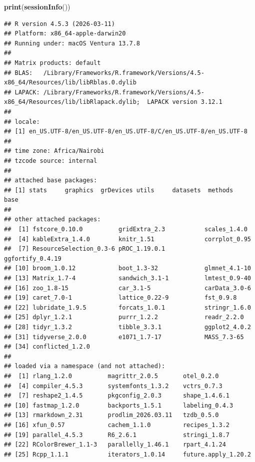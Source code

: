 \documentclass[
]{article}
\newenvironment{Shaded}{\begin{snugshade}}{\end{snugshade}}
\newcommand{\FunctionTok}[1]{\textcolor[rgb]{0.13,0.29,0.53}{\textbf{#1}}}
\newcommand{\NormalTok}[1]{#1}
\begin{document}
\begin{Shaded}
\begin{Highlighting}[]
\FunctionTok{print}\NormalTok{(}\FunctionTok{sessionInfo}\NormalTok{())}
\end{Highlighting}
\end{Shaded}

\begin{verbatim}
## R version 4.5.3 (2026-03-11)
## Platform: x86_64-apple-darwin20
## Running under: macOS Ventura 13.7.8
## 
## Matrix products: default
## BLAS:   /Library/Frameworks/R.framework/Versions/4.5-x86_64/Resources/lib/libRblas.0.dylib 
## LAPACK: /Library/Frameworks/R.framework/Versions/4.5-x86_64/Resources/lib/libRlapack.dylib;  LAPACK version 3.12.1
## 
## locale:
## [1] en_US.UTF-8/en_US.UTF-8/en_US.UTF-8/C/en_US.UTF-8/en_US.UTF-8
## 
## time zone: Africa/Nairobi
## tzcode source: internal
## 
## attached base packages:
## [1] stats     graphics  grDevices utils     datasets  methods   base     
## 
## other attached packages:
##  [1] fstcore_0.10.0          gridExtra_2.3           scales_1.4.0           
##  [4] kableExtra_1.4.0        knitr_1.51              corrplot_0.95          
##  [7] ResourceSelection_0.3-6 pROC_1.19.0.1           ggfortify_0.4.19       
## [10] broom_1.0.12            boot_1.3-32             glmnet_4.1-10          
## [13] Matrix_1.7-4            sandwich_3.1-1          lmtest_0.9-40          
## [16] zoo_1.8-15              car_3.1-5               carData_3.0-6          
## [19] caret_7.0-1             lattice_0.22-9          fst_0.9.8              
## [22] lubridate_1.9.5         forcats_1.0.1           stringr_1.6.0          
## [25] dplyr_1.2.1             purrr_1.2.2             readr_2.2.0            
## [28] tidyr_1.3.2             tibble_3.3.1            ggplot2_4.0.2          
## [31] tidyverse_2.0.0         e1071_1.7-17            MASS_7.3-65            
## [34] conflicted_1.2.0       
## 
## loaded via a namespace (and not attached):
##  [1] rlang_1.2.0          magrittr_2.0.5       otel_0.2.0          
##  [4] compiler_4.5.3       systemfonts_1.3.2    vctrs_0.7.3         
##  [7] reshape2_1.4.5       pkgconfig_2.0.3      shape_1.4.6.1       
## [10] fastmap_1.2.0        backports_1.5.1      labeling_0.4.3      
## [13] rmarkdown_2.31       prodlim_2026.03.11   tzdb_0.5.0          
## [16] xfun_0.57            cachem_1.1.0         recipes_1.3.2       
## [19] parallel_4.5.3       R6_2.6.1             stringi_1.8.7       
## [22] RColorBrewer_1.1-3   parallelly_1.46.1    rpart_4.1.24        
## [25] Rcpp_1.1.1           iterators_1.0.14     future.apply_1.20.2 

\end{verbatim}
\end{document}
